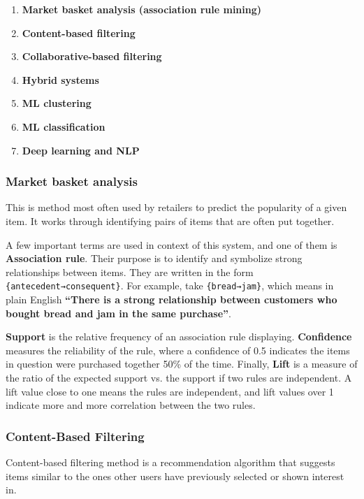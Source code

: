 \documentclass{article}
\begin{document}
\begin{enumerate}
	\item{\textbf{Market basket analysis (association rule mining)}}
	\item{\textbf{Content-based filtering}}
	\item{\textbf{Collaborative-based filtering}}
	\item{\textbf{Hybrid systems}}
	\item{\textbf{ML clustering}}
	\item{\textbf{ML classification}}
	\item{\textbf{Deep learning and NLP}}
\end{enumerate}

\subsubsection{Market basket analysis}

This is method most often used by retailers to predict the popularity of a given item. It works through identifying pairs of items that are often put together.

\medskip

A few important terms are used in context of this system, and one of them is \textbf{Association rule}. Their purpose is to identify and symbolize strong relationships between items. They are written in the form \texttt{\{antecedent→consequent\}}. For example, take \texttt{\{bread→jam\}}, which means in plain English \textbf{``There is a strong relationship between customers who bought bread and jam in the same purchase''}.

\medskip

\textbf{Support} is the relative frequency of an association rule displaying. \textbf{Confidence} measures the reliability of the rule, where a confidence of 0.5 indicates the items in question were purchased together 50\% of the time. Finally, \textbf{Lift} is a measure of the ratio of the expected support vs. the support if two rules are independent. A lift value close to one means the rules are independent, and lift values over 1 indicate more and more correlation between the two rules.

\subsubsection{Content-Based Filtering}

Content-based filtering method is a recommendation algorithm that suggests items similar to the ones other users have previously selected or shown interest in.
\end{document}
